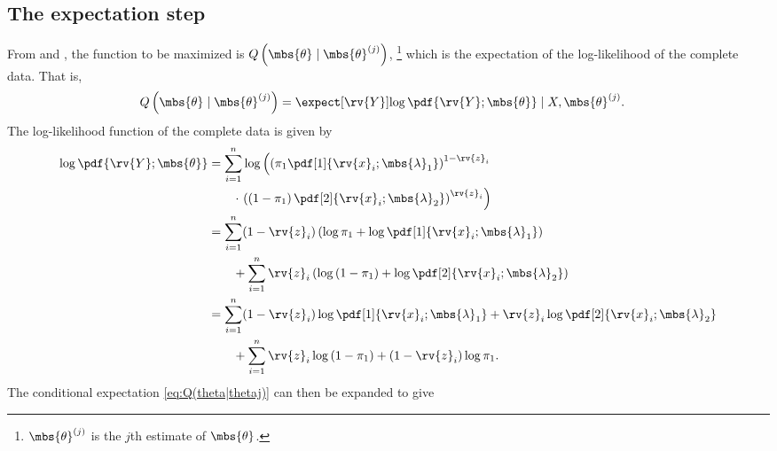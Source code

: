 \subsection{The expectation step}
From \cite{hastieElementsStatisticalLearning2009} and \cite{wassermanAllStatisticsConcise2004}, the function to be maximized is $Q\left(\mbs{\theta}\mid\mbs{\theta}^{(j)}\right)$,
\footnote{$\mbs{\theta}^{(j)}$ is the $j$th estimate of $\mbs{\theta}$.} which is the expectation of the log-likelihood of the complete data. That is,
\begin{align}
    \label{eq:Q(theta|thetaj)}
    Q\left(\mbs{\theta}\mid\mbs{\theta}^{(j)}\right) &= \expect[\rv{Y}]{\log \pdf{\rv{Y} ; \mbs{\theta}} \mid X, \mbs{\theta}^{(j)}}.
\end{align}
The log-likelihood function of the complete data is given by
\begin{align}
    \log \pdf{\rv{Y} ; \mbs{\theta}} 
    &=
    \sum_{i=1}^{n}
    \log \left( \left(\pi_{1}\pdf[1]{\rv{x}_{i}; \mbs{\lambda}_{1}}\right)^{1-\rv{z}_{i}} \right.\nonumber\\&\qquad\cdot\left.\left( \left(1-\pi_{1}\right)\pdf[2]{\rv{x}_{i}; \mbs{\lambda}_{2}} \right)^{\rv{z}_{i}} \right) \\
    &=
    \sum_{i=1}^{n} (1-\rv{z}_{i})\left( \log \pi_{1}+ \log \pdf[1]{\rv{x}_{i}; \mbs{\lambda}_{1}} \right)\nonumber\\&\qquad
    +\sum_{i=1}^{n}\rv{z}_{i}\left(\log\left( 1-\pi_{1} \right)  + \log\pdf[2]{\rv{x}_{i}; \mbs{\lambda}_{2}}\right)\\
    &=
    \sum_{i=1}^{n} (1-\rv{z}_{i}) \log \pdf[1]{\rv{x}_{i}; \mbs{\lambda}_{1}} + \rv{z}_{i}\log\pdf[2]{\rv{x}_{i}; \mbs{\lambda}_{2}}
    \nonumber\\&\qquad
    +\sum_{i=1}^{n}\rv{z}_{i}\log\left( 1-\pi_{1} \right) + (1-\rv{z}_{i})\log \pi_{1}.
\end{align}
The conditional expectation \eqref{eq:Q(theta|thetaj)} can then be expanded to give
